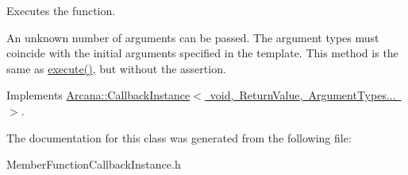 Executes the function. 

An unknown number of arguments can be passed. The argument types must coincide with the initial arguments specified in the template. This method is the same as \mbox{\hyperlink{class_arcana_1_1_member_function_callback_instance_aa3da0ee51ae4a6465844c7af67da7d83}{execute()}}, but without the assertion. 

Implements \mbox{\hyperlink{class_arcana_1_1_callback_instance_af4aced5d787cabb857931ecd87c3ab50}{Arcana\+::\+Callback\+Instance$<$ void, Return\+Value, Argument\+Types... $>$}}.



The documentation for this class was generated from the following file\+:\begin{DoxyCompactItemize}
\item 
Member\+Function\+Callback\+Instance.\+h\end{DoxyCompactItemize}
